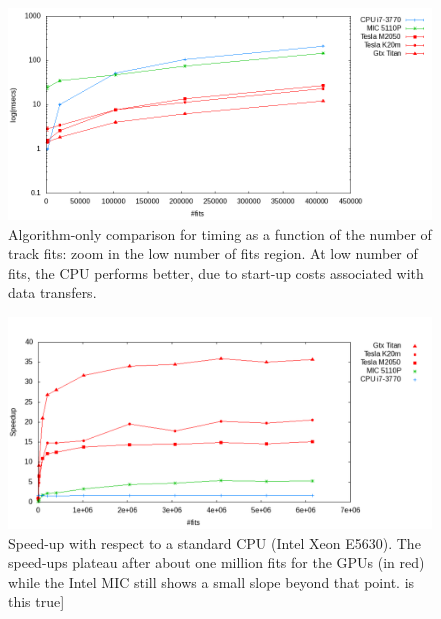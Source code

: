\documentclass[a4]{jpconf}
\providecommand{\fixme}[1]{\xspace{\sffamily{[\bfseries{}FIXME:} #1]}}
\begin{document}
  \begin{figure}[!tbp]
    \centering
    \includegraphics[width=0.9\linewidth]{figures/TimeCompZoom_MIC.png} 
    \caption{Algorithm-only comparison for timing as a function of the
      number of track fits: zoom in the low number of fits region. At
      low number of fits, the CPU performs better, due to start-up
      costs associated with data transfers.}
    \label{fig:algo_only_timing_zoom}
  \end{figure}
 
 \begin{figure}[!tbp]
   \centering
   \includegraphics[width=0.9\linewidth]{figures/Speedup_MIC}
   \caption{Speed-up with respect to a standard CPU (Intel Xeon
     E5630). The speed-ups plateau after about one million fits for
     the GPUs (in red) while the Intel MIC still shows a small slope
     beyond that point. \fixme{is this true}}
   \label{fig:algo_only_speedup}
 \end{figure}
\end{document}

